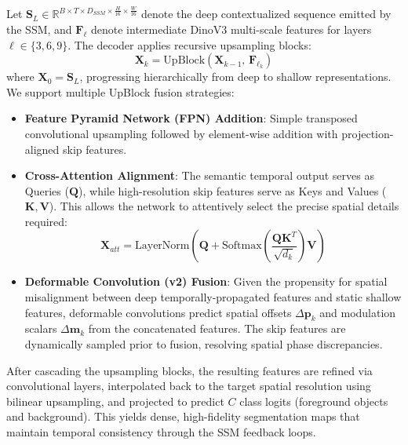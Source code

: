 Let $\mathbf{S}_{L} \in \mathbb{R}^{B \times T \times D_{SSM} \times \frac{H}{16} \times \frac{W}{16}}$ denote the deep contextualized sequence emitted by the SSM, and $\mathbf{F}_\ell$ denote intermediate DinoV3 multi-scale features for layers $\ell \in \{3, 6, 9\}$. The decoder applies recursive upsampling blocks:
\begin{equation}
    \mathbf{X}_k = \text{UpBlock}(\mathbf{X}_{k-1},\, \mathbf{F}_{\ell_k})
\end{equation}
where $\mathbf{X}_0 = \mathbf{S}_{L}$, progressing hierarchically from deep to shallow representations. We support multiple UpBlock fusion strategies:
\begin{itemize}
    \item \textbf{Feature Pyramid Network (FPN) Addition}: Simple transposed convolutional upsampling followed by element-wise addition with projection-aligned skip features.
    \item \textbf{Cross-Attention Alignment}: The semantic temporal output serves as Queries ($\mathbf{Q}$), while high-resolution skip features serve as Keys and Values ($\mathbf{K}, \mathbf{V}$). This allows the network to attentively select the precise spatial details required:
    \begin{equation}
        \mathbf{X}_{att} = \text{LayerNorm}\left(\mathbf{Q} + \text{Softmax}\left(\frac{\mathbf{Q}\mathbf{K}^T}{\sqrt{d_k}}\right)\mathbf{V}\right)
    \end{equation}
    \item \textbf{Deformable Convolution (v2) Fusion}: Given the propensity for spatial misalignment between deep temporally-propagated features and static shallow features, deformable convolutions predict spatial offsets $\Delta \mathbf{p}_k$ and modulation scalars $\Delta \mathbf{m}_k$ from the concatenated features. The skip features are dynamically sampled prior to fusion, resolving spatial phase discrepancies.
\end{itemize}
After cascading the upsampling blocks, the resulting features are refined via convolutional layers, interpolated back to the target spatial resolution using bilinear upsampling, and projected to predict $C$ class logits (foreground objects and background). This yields dense, high-fidelity segmentation maps that maintain temporal consistency through the SSM feedback loops.
